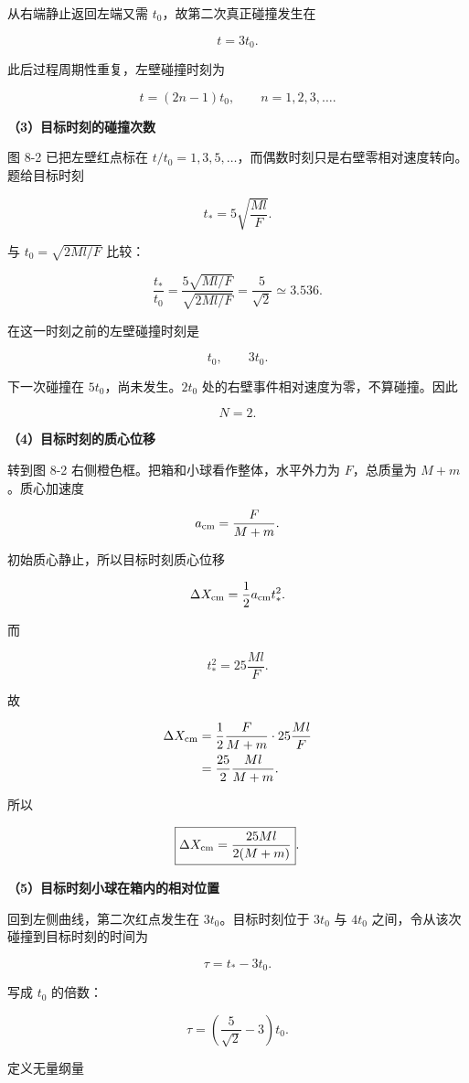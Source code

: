 \documentclass[12pt,a4paper,UTF8]{ctexart}
\begin{document}
从右端静止返回左端又需 \(t_0\)，故第二次真正碰撞发生在

\[t=3t_0.\]

此后过程周期性重复，左壁碰撞时刻为

\[
\boxed{t=(2n-1)t_0,\qquad n=1,2,3,\ldots}.
\]

\textbf{（3）目标时刻的碰撞次数}

图 8-2 已把左壁红点标在
\(t/t_0=1,3,5,\ldots\)，而偶数时刻只是右壁零相对速度转向。题给目标时刻

\[
t_*=5\sqrt{\frac{Ml}{F}}.
\]

与 \(t_0=\sqrt{2Ml/F}\) 比较：

\[
\frac{t_*}{t_0}
=\frac{5\sqrt{Ml/F}}{\sqrt{2Ml/F}}
=\frac5{\sqrt2}
\simeq3.536.
\]

在这一时刻之前的左壁碰撞时刻是

\[t_0,\qquad 3t_0.\]

下一次碰撞在 \(5t_0\)，尚未发生。\(2t_0\)
处的右壁事件相对速度为零，不算碰撞。因此

\[
\boxed{N=2}.
\]

\textbf{（4）目标时刻的质心位移}

转到图 8-2 右侧橙色框。把箱和小球看作整体，水平外力为 \(F\)，总质量为
\(M+m\)。质心加速度

\[
a_{\rm cm}=\frac{F}{M+m}.
\]

初始质心静止，所以目标时刻质心位移

\[
\Delta X_{\rm cm}=\frac12a_{\rm cm}t_*^2.
\]

而

\[
t_*^2=25\frac{Ml}{F}.
\]

故

\[
\begin{aligned}
\Delta X_{\rm cm}
&=\frac12\frac{F}{M+m}\cdot25\frac{Ml}{F}\\
&=\frac{25}{2}\frac{Ml}{M+m}.
\end{aligned}
\]

所以

\[
\boxed{
\Delta X_{\rm cm}=\frac{25Ml}{2(M+m)}
}.
\]

\textbf{（5）目标时刻小球在箱内的相对位置}

回到左侧曲线，第二次红点发生在 \(3t_0\)。目标时刻位于 \(3t_0\) 与
\(4t_0\) 之间，令从该次碰撞到目标时刻的时间为

\[
\tau=t_*-3t_0.
\]

写成 \(t_0\) 的倍数：

\[
\tau=\left(\frac5{\sqrt2}-3\right)t_0.
\]

定义无量纲量
\end{document}
